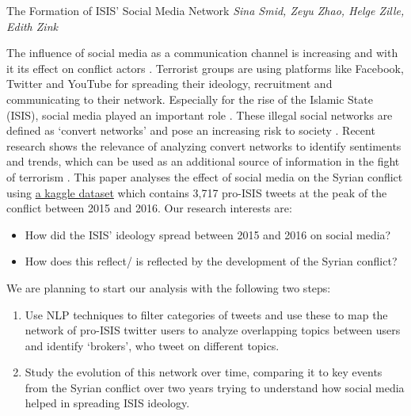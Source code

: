 \documentclass[11pt,a4paper]{article}
\begin{document}
\begin{center}
{\huge{The Formation of ISIS' Social Media Network}}
\bigbreak
\textit{Sina Smid, Zeyu Zhao, Helge Zille, Edith Zink}
\end{center}

The influence of social media as a communication channel is increasing and with it its effect on conflict actors \parencite{Zeitzoff_2017}. Terrorist groups are using platforms like Facebook, Twitter and YouTube for spreading their ideology, recruitment and communicating to their network. Especially for the rise of the Islamic State (ISIS), social media played an important role \parencite{Ferrara_2017}. These illegal social networks are defined as ‘convert networks’ and pose an increasing risk to society \parencite{Freeman_2017}. Recent research shows the relevance of analyzing convert networks to identify sentiments and trends, which can be used as an additional source of information in the fight of terrorism \parencite{Awan_2017, Mitts_2018}.
\bigbreak
This paper analyses the effect of social media on the Syrian conflict using \href{https://www.kaggle.com/fifthtribe/how-isis-uses-twitter}{a kaggle dataset} which contains 3,717 pro-ISIS tweets at the peak of the conflict between 2015 and 2016.
\bigbreak
Our research interests are:
\begin{itemize}
\item How did the ISIS’ ideology spread between 2015 and 2016 on social media?
\item How does this reflect/ is reflected by the development of the Syrian conflict?
\end{itemize} 

We are planning to start our analysis with the following two steps:
\begin{enumerate}
\item Use NLP techniques to filter categories of tweets and use these to map the network of pro-ISIS twitter users to analyze overlapping topics between users and identify ‘brokers’, who tweet on different topics. 
\item Study the evolution of this network over time, comparing it to key events from the Syrian conflict over two years trying to understand how social media helped in spreading ISIS ideology.
\end{enumerate}

\cleardoublepage
{}
\printbibheading
\printbibliography

\end{document}

